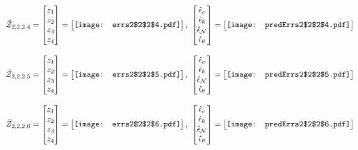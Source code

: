 \documentclass[12pt]{article}
\begin{document}
\begin{gather*}
\bar{\mathcal{Z}}_{2,2,2,4}=\begin{bmatrix}
z_1\\
z_2\\
z_3\\
z_4
 \end{bmatrix}= \begin{bmatrix}
\vcenter{\hbox{\texttt{[image: errs2\$2\$2\$4.pdf]}}}
 \end{bmatrix},\,\, \begin{bmatrix}
\hat{\epsilon}_c\\\hat{\epsilon}_k\\\hat{\epsilon}_\mathcal{N}\\\hat{\epsilon}_\theta
 \end{bmatrix}=\begin{bmatrix}
\vcenter{\hbox{\texttt{[image: predErrs2\$2\$2\$4.pdf]}}}
 \end{bmatrix}
\end{gather*}

\begin{gather*}
\bar{\mathcal{Z}}_{2,2,2,5}=\begin{bmatrix}
z_1\\
z_2\\
z_3\\
z_4
 \end{bmatrix}= \begin{bmatrix}
\vcenter{\hbox{\texttt{[image: errs2\$2\$2\$5.pdf]}}}
 \end{bmatrix},\,\, \begin{bmatrix}
\hat{\epsilon}_c\\\hat{\epsilon}_k\\\hat{\epsilon}_\mathcal{N}\\\hat{\epsilon}_\theta
 \end{bmatrix}=\begin{bmatrix}
\vcenter{\hbox{\texttt{[image: predErrs2\$2\$2\$5.pdf]}}}
 \end{bmatrix}
\end{gather*}


\begin{gather*}
\bar{\mathcal{Z}}_{2,2,2,6}=\begin{bmatrix}
z_1\\
z_2\\
z_3\\
z_4
 \end{bmatrix}= \begin{bmatrix}
\vcenter{\hbox{\texttt{[image: errs2\$2\$2\$6.pdf]}}}
 \end{bmatrix},\,\, \begin{bmatrix}
\hat{\epsilon}_c\\\hat{\epsilon}_k\\\hat{\epsilon}_\mathcal{N}\\\hat{\epsilon}_\theta
 \end{bmatrix}=\begin{bmatrix}
\vcenter{\hbox{\texttt{[image: predErrs2\$2\$2\$6.pdf]}}}
 \end{bmatrix}
\end{gather*}
\end{document}
